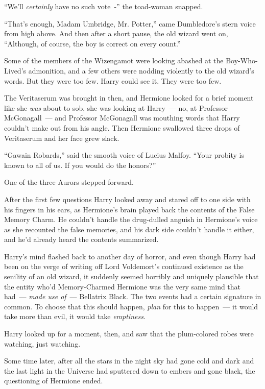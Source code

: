 ``We'll \emph{certainly} have no such vote~-'' the toad-woman snapped.

``That's enough, Madam Umbridge, Mr. Potter,'' came Dumbledore's stern voice from high above. And then after a short pause, the old wizard went on, ``Although, of course, the boy is correct on every count.''

Some of the members of the Wizengamot were looking abashed at the Boy-Who-Lived's admonition, and a few others were nodding violently to the old wizard's words. But they were too few. Harry could see it. They were too few.

The Veritaserum was brought in then, and Hermione looked for a brief moment like she \emph{was} about to sob, she was looking at Harry~--- no, at Professor McGonagall~--- and Professor McGonagall was mouthing words that Harry couldn't make out from his angle. Then Hermione swallowed three drops of Veritaserum and her face grew slack.

``Gawain Robards,'' said the smooth voice of Lucius Malfoy. ``Your probity is known to all of us. If you would do the honors?''

One of the three Aurors stepped forward.

After the first few questions Harry looked away and stared off to one side with his fingers in his ears, as Hermione's brain played back the contents of the False Memory Charm. He couldn't handle the drug-dulled anguish in Hermione's voice as she recounted the false memories, and his dark side couldn't handle it either, and he'd already heard the contents summarized.

Harry's mind flashed back to another day of horror, and even though Harry had been on the verge of writing off Lord Voldemort's continued existence as the senility of an old wizard, it suddenly seemed horribly and uniquely plausible that the entity who'd Memory-Charmed Hermione was the very same mind that had~--- \emph{made use of}~--- Bellatrix Black. The two events had a certain signature in common. To choose that this should happen, \emph{plan} for this to happen~--- it would take more than evil, it would take \emph{emptiness}.

Harry looked up for a moment, then, and saw that the plum-colored robes were watching, just watching.

Some time later, after all the stars in the night sky had gone cold and dark and the last light in the Universe had sputtered down to embers and gone black, the questioning of Hermione ended.

